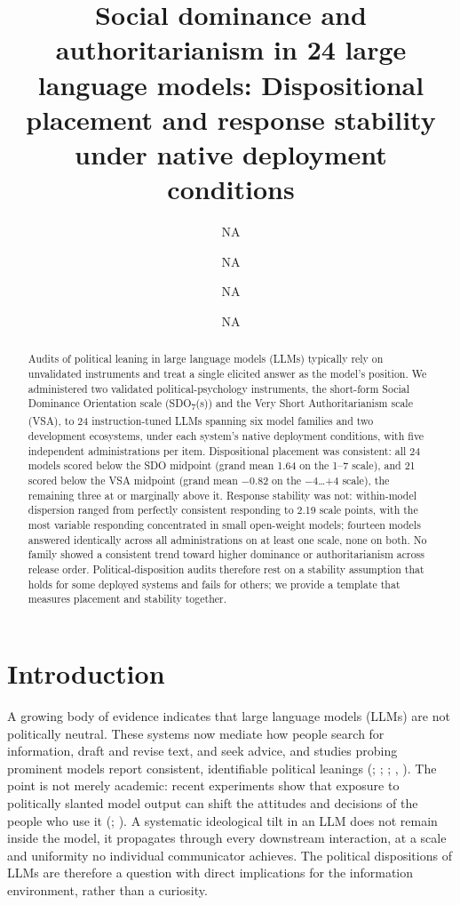 \documentclass[
]{article}
\title{Social dominance and authoritarianism in 24 large language
models: Dispositional placement and response stability under native
deployment conditions}
\author{NA \and NA \and NA \and NA}
\date{}
\newcounter{none} %
\begin{document}
\maketitle
\begin{abstract}
Audits of political leaning in large language models (LLMs) typically
rely on unvalidated instruments and treat a single elicited answer as
the model's position. We administered two validated political-psychology
instruments, the short-form Social Dominance Orientation scale
(SDO\textsubscript{7}(s)) and the Very Short Authoritarianism scale
(VSA), to 24 instruction-tuned LLMs spanning six model families and two
development ecosystems, under each system's native deployment
conditions, with five independent administrations per item.
Dispositional placement was consistent: all 24 models scored below the
SDO midpoint (grand mean 1.64 on the 1--7 scale), and 21 scored below
the VSA midpoint (grand mean −0.82 on the −4\ldots+4 scale), the
remaining three at or marginally above it. Response stability was not:
within-model dispersion ranged from perfectly consistent responding to
2.19 scale points, with the most variable responding concentrated in
small open-weight models; fourteen models answered identically across
all administrations on at least one scale, none on both. No family
showed a consistent trend toward higher dominance or authoritarianism
across release order. Political-disposition audits therefore rest on a
stability assumption that holds for some deployed systems and fails for
others; we provide a template that measures placement and stability
together.
\end{abstract}


\section{Introduction}\label{introduction}

A growing body of evidence indicates that large language models (LLMs)
are not politically neutral. These systems now mediate how people search
for information, draft and revise text, and seek advice, and studies
probing prominent models report consistent, identifiable political
leanings (;
;
;
,
). The point is not merely academic:
recent experiments show that exposure to politically slanted model
output can shift the attitudes and decisions of the people who use it
(;
). A systematic
ideological tilt in an LLM does not remain inside the model, it
propagates through every downstream interaction, at a scale and
uniformity no individual communicator achieves. The political
dispositions of LLMs are therefore a question with direct implications
for the information environment, rather than a curiosity.
\end{document}
